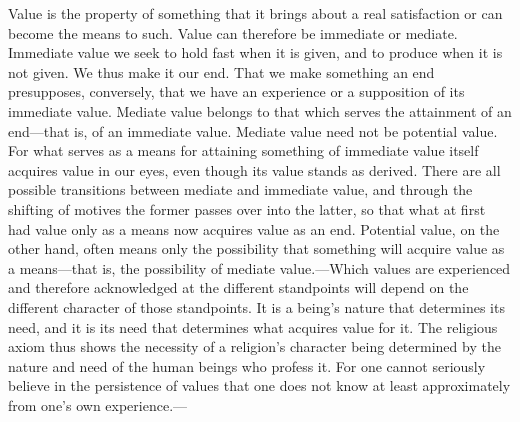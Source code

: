 \documentclass[12pt,a4paper]{book}
\newcommand{\opage}[1]{\marginnote{\footnotesize\textit{[#1]}}}
\begin{document}
Value is the property of something that it brings about a real
satisfaction or can become the means to such. Value can therefore be
immediate or mediate. Immediate value we seek to hold fast when it is
given, and to produce when it is not given. We thus make it our end.
That we make something an end presupposes, conversely, that we have an
experience or a supposition of its immediate value. Mediate value
belongs 
\opage{11}to that which serves the attainment of an end---that is, of an
immediate value. Mediate value need not be potential value. For what
serves as a means for attaining something of immediate value itself
acquires value in our eyes, even though its value stands as derived.
There are all possible transitions between mediate and immediate value,
and through the shifting of motives the former passes over into the
latter, so that what at first had value only as a means now acquires
value as an end. Potential value, on the other hand, often means only
the possibility that something will acquire value as a means---that is,
the possibility of mediate value.---Which values are experienced and
therefore acknowledged at the different standpoints will depend on the
different character of those standpoints. It is a being's nature that
determines its need, and it is its need that determines what acquires
value for it. The religious axiom thus shows the necessity of a
religion's character being determined by the nature and need of the
human beings who profess it. For one cannot seriously believe in the
persistence of values that one does not know at least approximately from
one's own experience.---

\end{document}
